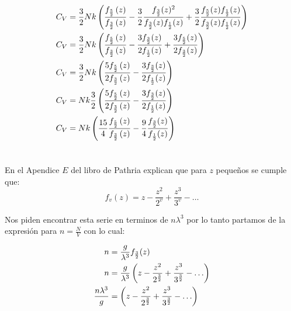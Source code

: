\documentclass{report}
\begin{document}
\begin{align*}
  C_V &= \frac{3}{2}Nk\left( \frac{f_{\frac{5}{2}}\left(z\right)}{f_{\frac{3}{2}}\left(z\right)} - \frac{3}{2}\frac{f_{\frac{3}{2}}(z)^2}{f_{\frac{3}{2}}(z)f_{\frac{1}{2}}(z)}   + \frac{3}{2}\frac{f_{\frac{5}{2}}(z) f_{\frac{1}{2}}(z)}{f_{\frac{3}{2}}(z)f_{\frac{1}{2}}(z)} \right)\\
  C_V &= \frac{3}{2}Nk\left( \frac{f_{\frac{5}{2}}\left(z\right)}{f_{\frac{3}{2}}\left(z\right)} - \frac{3f_{\frac{3}{2}}(z)}{2f_{\frac{1}{2}}(z)}   + \frac{3f_{\frac{5}{2}}(z)}{2f_{\frac{3}{2}}(z)} \right)\\
  C_V &= \frac{3}{2}Nk\left( \frac{5f_{\frac{5}{2}}\left(z\right)}{2f_{\frac{3}{2}}\left(z\right)} - \frac{3f_{\frac{3}{2}}(z)}{2f_{\frac{1}{2}}(z)}\right)\\
  C_V &= Nk\frac{3}{2}\left( \frac{5f_{\frac{5}{2}}\left(z\right)}{2f_{\frac{3}{2}}\left(z\right)} - \frac{3f_{\frac{3}{2}}(z)}{2f_{\frac{1}{2}}(z)}\right)\\
  C_V &= Nk\left(\frac{15}{4}\frac{f_{\frac{5}{2}}\left(z\right)}{f_{\frac{3}{2}}\left(z\right)} - \frac{9}{4}\frac{f_{\frac{3}{2}}(z)}{f_{\frac{1}{2}}(z)}\right)\\
\end{align*}

\section{}

En el Apendice $E$ del libro de Pathria explican que para $z$ pequeños se cumple que:
\[
  f_v(z) = z - \frac{z^2}{2^v} + \frac{z^3}{3^v} - \ldots
\]

Nos piden encontrar esta serie en terminos de $n\lambda^3$ por lo tanto partamos de la expresión para $n = \frac{N}{V}$ con lo cual:

\begin{align*}
  n &= \frac{g}{\lambda^3}f_{\frac{3}{2}}(z)\\
  n &= \frac{g}{\lambda^3}\left(z - \frac{z^2}{2^{\frac{3}{2}}} + \frac{z^3}{3^{\frac{3}{2}}} - \ldots\right)\\
  \frac{n\lambda^3}{g} &= \left(z - \frac{z^2}{2^{\frac{3}{2}}} + \frac{z^3}{3^{\frac{3}{2}}} - \ldots\right)
\end{align*}

\section{}

\section{}
\end{document}
